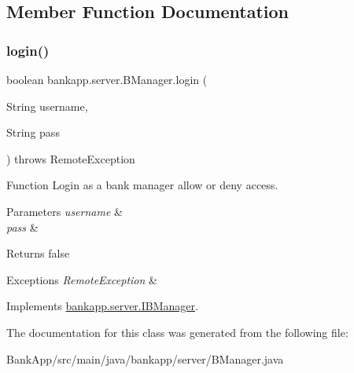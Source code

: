 \subsection{Member Function Documentation}
\mbox{\label{classbankapp_1_1server_1_1BManager_abdeb5e23b534babeed067c3667fcafd3}} 
\subsubsection{\texorpdfstring{login()}{login()}}
{\footnotesize\ttfamily boolean bankapp.\+server.\+B\+Manager.\+login (\begin{DoxyParamCaption}\item[{String}]{username,  }\item[{String}]{pass }\end{DoxyParamCaption}) throws Remote\+Exception}



Function Login as a bank manager allow or deny access. 


\begin{DoxyParams}{Parameters}
{\em username} & \\
\hline
{\em pass} & \\
\hline
\end{DoxyParams}
\begin{DoxyReturn}{Returns}
false 
\end{DoxyReturn}

\begin{DoxyExceptions}{Exceptions}
{\em Remote\+Exception} & \\
\hline
\end{DoxyExceptions}


Implements \hyperlink{interfacebankapp_1_1server_1_1IBManager_a29f3426c104732dda17dc8b215b746e1}{bankapp.\+server.\+I\+B\+Manager}.



The documentation for this class was generated from the following file\+:\begin{DoxyCompactItemize}
\item 
Bank\+App/src/main/java/bankapp/server/B\+Manager.\+java\end{DoxyCompactItemize}
